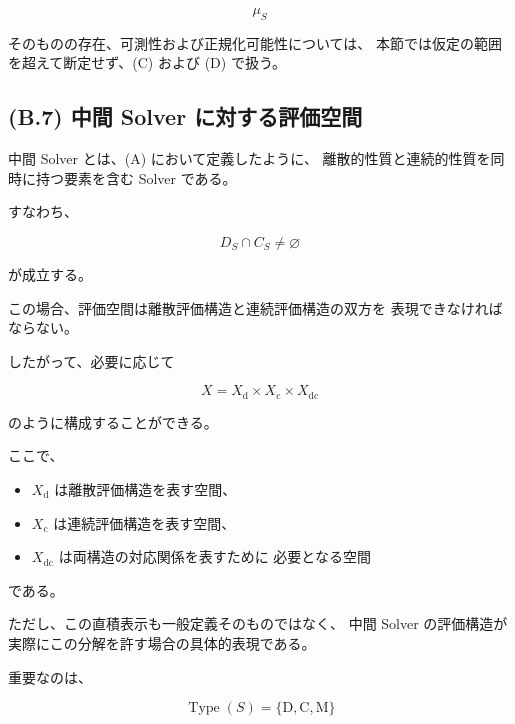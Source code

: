 \documentclass[a4paper,11pt]{article}
\newcommand{\DType}{\mathrm{D}}
\newcommand{\CType}{\mathrm{C}}
\newcommand{\MType}{\mathrm{M}}
\begin{document}
\begin{equation}
    \mu_S
\end{equation}

そのものの存在、可測性および正規化可能性については、
本節では仮定の範囲を超えて断定せず、(C) および (D) で扱う。


\subsection{(B.7) 中間 Solver に対する評価空間}
\label{subsec:B7}

中間 Solver とは、(A) において定義したように、
離散的性質と連続的性質を同時に持つ要素を含む Solver である。

すなわち、

\begin{equation}
    D_S\cap C_S
    \neq
    \varnothing
    \label{eq:B-intermediate-condition}
\end{equation}

が成立する。

この場合、評価空間は離散評価構造と連続評価構造の双方を
表現できなければならない。

したがって、必要に応じて

\begin{equation}
    X
    =
    X_{\mathrm d}
    \times
    X_{\mathrm c}
    \times
    X_{\mathrm{dc}}
    \label{eq:B-intermediate-space}
\end{equation}

のように構成することができる。

ここで、

\begin{itemize}
    \item $X_{\mathrm d}$ は離散評価構造を表す空間、
    \item $X_{\mathrm c}$ は連続評価構造を表す空間、
    \item $X_{\mathrm{dc}}$ は両構造の対応関係を表すために
          必要となる空間
\end{itemize}

である。

ただし、この直積表示も一般定義そのものではなく、
中間 Solver の評価構造が実際にこの分解を許す場合の具体的表現である。

重要なのは、

\begin{equation}
    \operatorname{Type}(S)
    =
    \{\DType,\CType,\MType\}
\end{equation}
\end{document}
